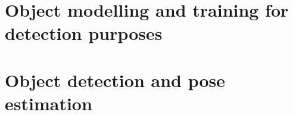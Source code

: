 \usepackage{amsmath}
\usepackage[
backend=biber,
style=numeric, %
]{biblatex}

\newcommand{\vmiddle}[1]{\begin{tabular}{@{}c@{}} {#1} \end{tabular}}

\english
\chapter{Object modelling and training for detection purposes}



\chapter{Object detection and pose estimation}

\printbibliography

